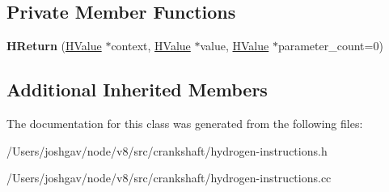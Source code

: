 \subsection*{Private Member Functions}
\begin{DoxyCompactItemize}
\item 
{\bfseries H\+Return} (\hyperlink{classv8_1_1internal_1_1_h_value}{H\+Value} $\ast$context, \hyperlink{classv8_1_1internal_1_1_h_value}{H\+Value} $\ast$value, \hyperlink{classv8_1_1internal_1_1_h_value}{H\+Value} $\ast$parameter\+\_\+count=0)\hypertarget{classv8_1_1internal_1_1_h_return_a5afced18a0cbe3dbfd35d4a72bb33e31}{}\label{classv8_1_1internal_1_1_h_return_a5afced18a0cbe3dbfd35d4a72bb33e31}

\end{DoxyCompactItemize}
\subsection*{Additional Inherited Members}


The documentation for this class was generated from the following files\+:\begin{DoxyCompactItemize}
\item 
/\+Users/joshgav/node/v8/src/crankshaft/hydrogen-\/instructions.\+h\item 
/\+Users/joshgav/node/v8/src/crankshaft/hydrogen-\/instructions.\+cc\end{DoxyCompactItemize}
